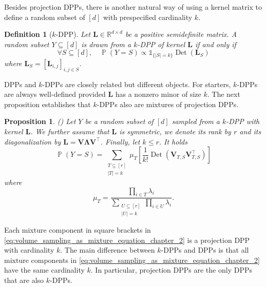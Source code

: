 \documentclass[twoside,11pt]{book}
\newtheorem{proposition}{Proposition}
\newtheorem{definition}{Definition}
\numberwithin{theorem}{chapter}
\numberwithin{definition}{chapter}
\numberwithin{proposition}{chapter}
\numberwithin{corollary}{chapter}
\numberwithin{example}{chapter}
\numberwithin{lemma}{chapter}
\numberwithin{assumption}{chapter}
\numberwithin{equation}{chapter}
\numberwithin{figure}{chapter}
\DeclareMathOperator{\Det}{Det}
\DeclareMathOperator{\Tran}{\intercal}
\DeclareMathOperator{\Prb}{\mathbb{P}}
\begin{document}
Besides projection DPPs, there is another natural way of using a kernel matrix to define a random subset of $[d]$ with prespecified cardinality $k$.
\begin{definition}[$k$-DPP]\label{def:kDPP}
Let $\bm{L} \in \mathbb{R}^{d\times d}$ be a positive semidefinite matrix.
A random subset $Y \subseteq [d]$ is drawn from a $k$-DPP of kernel $\bm{L}$ if and only if
\begin{equation}\label{eq:def_kdpp}
\forall S \subseteq [d],\quad \Prb(Y = S) \propto \mathbb{1}_{\{\vert S\vert = k\}}\Det(\bm{L}_{S})
\end{equation}
where $\bm{L}_{S} = [\bm{L}_{i,j}]_{i,j \in S}$.
\end{definition}
DPPs and $k$-DPPs are closely related but different objects. For starters, $k$-DPPs are always well-defined provided $\bm{L}$ has a nonzero minor of size $k$. The next proposition establishes that $k$-DPPs also are mixtures of projection DPPs.
\begin{proposition}(\citet[Section 5.2.2]{KuTa12})
\label{prop:kdpp_mixture_proposition}
Let $Y$ be a random subset of $[d]$ sampled from a $k$-DPP with kernel $\bm{L}$. We further assume that $\bm L$ is symmetric, we denote its rank by $r$ and its diagonalization by $\bm L = \bm{V}\bm{\Lambda}\bm{V}^{\Tran}$. Finally, let $k\leq r$. It holds
\begin{equation}
\label{eq:volume_sampling_as_mixture_equation_chapter_2}
\Prb(Y = S) = \sum\limits_{\substack{T \subseteq [r]\\|T| = k}} \mu_{T} \left[\frac{1}{k!} \Det\left(\bm{V}_{T,S}\bm{V}^{\Tran}_{T,S}\right)\right]
\end{equation}
where
\begin{equation}
\mu_{T} = \frac{\prod_{i \in T}\lambda_{i}}{\sum\limits_{\substack{U \subseteq[r]\\ |U| = k}}\prod_{i \in U}\lambda_{i}}.
\label{e:kDPPWeights}
\end{equation}
\end{proposition}
Each mixture component in square brackets in \eqref{eq:volume_sampling_as_mixture_equation_chapter_2} is a projection DPP with cardinality $k$. The main difference between $k$-DPPs and DPPs is that all mixture components in \eqref{eq:volume_sampling_as_mixture_equation_chapter_2} have the same cardinality $k$. In particular, projection DPPs are the only DPPs that are also $k$-DPPs.
\end{document}
